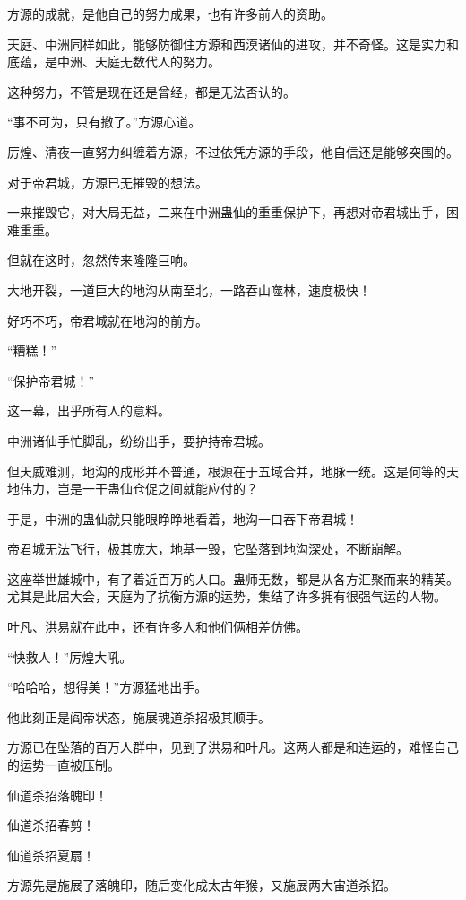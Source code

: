 
\begin{this_body}

方源的成就，是他自己的努力成果，也有许多前人的资助。

天庭、中洲同样如此，能够防御住方源和西漠诸仙的进攻，并不奇怪。这是实力和底蕴，是中洲、天庭无数代人的努力。

这种努力，不管是现在还是曾经，都是无法否认的。

“事不可为，只有撤了。”方源心道。

厉煌、清夜一直努力纠缠着方源，不过依凭方源的手段，他自信还是能够突围的。

对于帝君城，方源已无摧毁的想法。

一来摧毁它，对大局无益，二来在中洲蛊仙的重重保护下，再想对帝君城出手，困难重重。

但就在这时，忽然传来隆隆巨响。

大地开裂，一道巨大的地沟从南至北，一路吞山噬林，速度极快！

好巧不巧，帝君城就在地沟的前方。

“糟糕！”

“保护帝君城！”

这一幕，出乎所有人的意料。

中洲诸仙手忙脚乱，纷纷出手，要护持帝君城。

但天威难测，地沟的成形并不普通，根源在于五域合并，地脉一统。这是何等的天地伟力，岂是一干蛊仙仓促之间就能应付的？

于是，中洲的蛊仙就只能眼睁睁地看着，地沟一口吞下帝君城！

帝君城无法飞行，极其庞大，地基一毁，它坠落到地沟深处，不断崩解。

这座举世雄城中，有了着近百万的人口。蛊师无数，都是从各方汇聚而来的精英。尤其是此届大会，天庭为了抗衡方源的运势，集结了许多拥有很强气运的人物。

叶凡、洪易就在此中，还有许多人和他们俩相差仿佛。

“快救人！”厉煌大吼。

“哈哈哈，想得美！”方源猛地出手。

他此刻正是阎帝状态，施展魂道杀招极其顺手。

方源已在坠落的百万人群中，见到了洪易和叶凡。这两人都是和连运的，难怪自己的运势一直被压制。

仙道杀招落魄印！

仙道杀招春剪！

仙道杀招夏扇！

方源先是施展了落魄印，随后变化成太古年猴，又施展两大宙道杀招。


\end{this_body}
